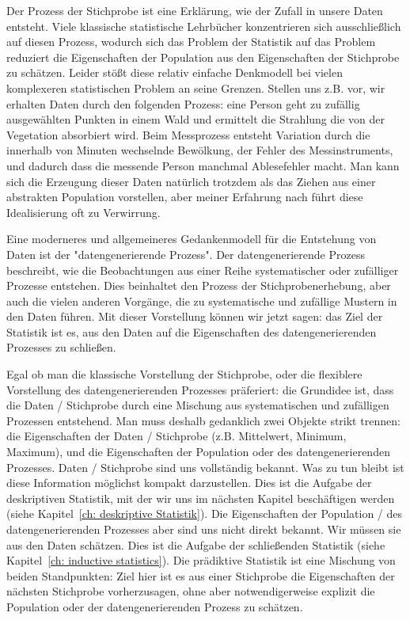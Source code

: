 \documentclass[a4paper,twoside]{tufte-book}\usepackage[]{graphicx}\usepackage[]{color}
\begin{document}
	Der Prozess der Stichprobe ist eine Erklärung, wie der Zufall in unsere Daten entsteht. Viele klassische statistische Lehrbücher konzentrieren sich ausschließlich auf diesen Prozess, wodurch sich das Problem der Statistik auf das Problem reduziert die Eigenschaften der Population aus den Eigenschaften der Stichprobe zu schätzen. Leider stößt diese relativ einfache Denkmodell bei vielen komplexeren statistischen Problem an seine Grenzen. Stellen uns z.B. vor, wir erhalten Daten durch den folgenden Prozess: eine Person geht zu zufällig ausgewählten Punkten in einem Wald und ermittelt die Strahlung die von der Vegetation absorbiert wird. Beim Messprozess entsteht Variation durch die innerhalb von Minuten wechselnde Bewölkung, der Fehler des Messinstruments, und dadurch dass die messende Person manchmal Ablesefehler macht. Man kann sich die Erzeugung dieser Daten natürlich trotzdem als das Ziehen aus einer abstrakten Population vorstellen, aber meiner Erfahrung nach führt diese Idealisierung oft zu Verwirrung. 
	
	
	Eine moderneres und allgemeineres Gedankenmodell für die Entstehung von Daten ist der "datengenerierende Prozess". Der datengenerierende Prozess beschreibt, wie die Beobachtungen aus einer Reihe systematischer oder zufälliger Prozesse entstehen. Dies beinhaltet den Prozess der Stichprobenerhebung, aber auch die vielen anderen Vorgänge, die zu systematische und zufällige Mustern in den Daten führen. Mit dieser Vorstellung können wir jetzt sagen: das Ziel der Statistik ist es, aus den Daten auf die Eigenschaften des datengenerierenden Prozesses zu schließen. 
	
	Egal ob man die klassische Vorstellung der Stichprobe, oder die flexiblere Vorstellung des datengenerierenden Prozesses präferiert: die Grundidee ist, dass die Daten / Stichprobe durch eine Mischung aus systematischen und zufälligen Prozessen entstehend. Man muss deshalb gedanklich zwei Objekte strikt trennen: die Eigenschaften der Daten / Stichprobe (z.B. Mittelwert, Minimum, Maximum), und die Eigenschaften der Population oder des datengenerierenden Prozesses. Daten / Stichprobe sind uns vollständig bekannt. Was zu tun bleibt ist diese Information möglichst kompakt darzustellen. Dies ist die Aufgabe der deskriptiven Statistik, mit der wir uns im nächsten Kapitel beschäftigen werden (siehe Kapitel~\ref{ch: deskriptive Statistik}). Die Eigenschaften der Population / des datengenerierenden Prozesses aber sind uns nicht direkt bekannt. Wir müssen sie aus den Daten schätzen. Dies ist die Aufgabe der schließenden Statistik (siehe Kapitel~\ref{ch: inductive statistics}). Die prädiktive Statistik ist eine Mischung von beiden Standpunkten: Ziel hier ist es aus einer Stichprobe die Eigenschaften der nächsten Stichprobe vorherzusagen, ohne aber notwendigerweise explizit die Population oder der datengenerierenden Prozess zu schätzen. 
	
\end{document}
